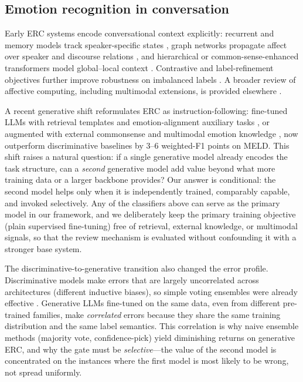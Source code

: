 \documentclass[final,5p,times,twocolumn]{elsarticle}
\begin{document}
\subsection{Emotion recognition in conversation}
Early ERC systems encode conversational context explicitly: recurrent and
memory models track speaker-specific states \citep{majumder2019dialoguernn},
graph networks propagate affect over speaker and discourse relations
\citep{ghosal2019dialoggcn,shen2021dag}, and hierarchical or
common-sense-enhanced transformers model global--local context
\citep{shen2021dialogxl,joshi2020cosmic,song2022emotionflow}. Contrastive and
label-refinement objectives further improve robustness on imbalanced labels
\citep{ji2023sacl,liu2023hidialog,jian2024emotrans}. A broader review of affective computing, including multimodal
extensions, is provided elsewhere \citep{poria2017review}.

A recent generative shift reformulates ERC as instruction-following:
fine-tuned LLMs with retrieval templates and emotion-alignment auxiliary
tasks \citep{lei2023instructerc}, or augmented with external commonsense
and multimodal emotion knowledge \citep{zhang2024dialoguellm}, now
outperform discriminative baselines by 3--6 weighted-F1 points on MELD.
This shift raises a natural question: if a single generative model already
encodes the task structure, can a \emph{second} generative model add value
beyond what more training data or a larger backbone provides? Our answer
is conditional: the second model helps only when it is independently
trained, comparably capable, and invoked selectively. Any of the
classifiers above can serve as the primary model in our framework, and we
deliberately keep the primary training objective (plain supervised
fine-tuning) free of retrieval, external knowledge, or multimodal signals,
so that the review mechanism is evaluated without confounding it with a
stronger base system.

The discriminative-to-generative transition also changed the error profile.
Discriminative models make errors that are largely uncorrelated across
architectures (different inductive biases), so simple voting ensembles were
already effective \citep{dietterich2000ensemble}. Generative LLMs fine-tuned
on the same data, even from different pre-trained families, make
\emph{correlated} errors because they share the same training distribution
and the same label semantics. This correlation is why naive ensemble
methods (majority vote, confidence-pick) yield diminishing returns on
generative ERC, and why the gate must be \emph{selective}---the value of
the second model is concentrated on the instances where the first model is
most likely to be wrong, not spread uniformly.
\end{document}
